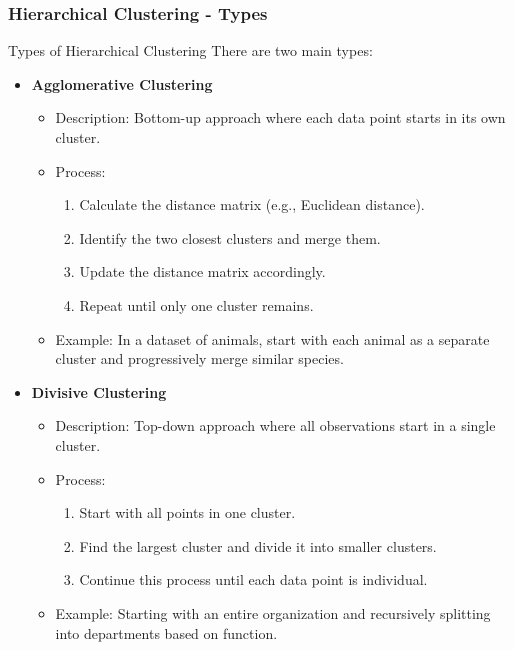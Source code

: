 \documentclass[aspectratio=169]{beamer}
\begin{document}
\begin{frame}[fragile]
    \frametitle{Hierarchical Clustering - Types}
    \begin{block}{Types of Hierarchical Clustering}
        There are two main types:
        \begin{itemize}
            \item \textbf{Agglomerative Clustering}
            \begin{itemize}
                \item Description: Bottom-up approach where each data point starts in its own cluster.
                \item Process:
                \begin{enumerate}
                    \item Calculate the distance matrix (e.g., Euclidean distance).
                    \item Identify the two closest clusters and merge them.
                    \item Update the distance matrix accordingly.
                    \item Repeat until only one cluster remains.
                \end{enumerate}
                \item Example: In a dataset of animals, start with each animal as a separate cluster and progressively merge similar species.
            \end{itemize}
            \item \textbf{Divisive Clustering}
            \begin{itemize}
                \item Description: Top-down approach where all observations start in a single cluster.
                \item Process:
                \begin{enumerate}
                    \item Start with all points in one cluster.
                    \item Find the largest cluster and divide it into smaller clusters.
                    \item Continue this process until each data point is individual.
                \end{enumerate}
                \item Example: Starting with an entire organization and recursively splitting into departments based on function.
            \end{itemize}
        \end{itemize}
    \end{block}
\end{frame}
\end{document}
